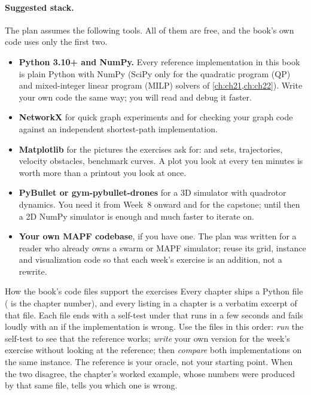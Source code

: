 \paragraph{Suggested stack.}
The plan assumes the following tools. All of them are free, and the book's own code uses
only the first two.
\begin{itemize}
  \item \textbf{Python 3.10+ and NumPy.} Every reference implementation in this book is
    plain Python with NumPy (SciPy only for the quadratic program (QP) and mixed-integer
    linear program (MILP) solvers of \cref{ch:ch21,ch:ch22}). Write your own code the same way; you will read and debug it
    faster.
  \item \textbf{NetworkX} \cite{hagberg2008networkx} for quick graph experiments and for
    checking your graph code against an independent shortest-path implementation.
  \item \textbf{Matplotlib} for the pictures the exercises ask for: \Open and \Closed sets,
    trajectories, velocity obstacles, benchmark curves. A plot you look at every ten
    minutes is worth more than a printout you look at once.
  \item \textbf{PyBullet or gym-pybullet-drones} \cite{panerati2021learning} for a 3D
    simulator with quadrotor dynamics. You need it from Week~8 onward and for the
    capstone; until then a 2D NumPy simulator is enough and much faster to iterate on.
  \item \textbf{Your own MAPF codebase}, if you have one. The plan was written for a reader
    who already owns a swarm or MAPF simulator; reuse its grid, instance and visualization
    code so that each week's exercise is an addition, not a rewrite.
\end{itemize}

\begin{notebox}{How the book's code files support the exercises}
Every chapter ships a Python file  ( is the chapter number),
and every listing in a chapter is a verbatim excerpt of that file. Each file ends with a
self-test under  that runs in a few seconds and
fails loudly with an  if the implementation is wrong. Use the files in this
order: \emph{run} the self-test to see that the reference works; \emph{write} your own
version for the week's exercise without looking at the reference; then \emph{compare} both
implementations on the same instance. The reference is your oracle, not your starting
point. When the two disagree, the chapter's worked example, whose numbers were produced by
that same file, tells you which one is wrong.
\end{notebox}

